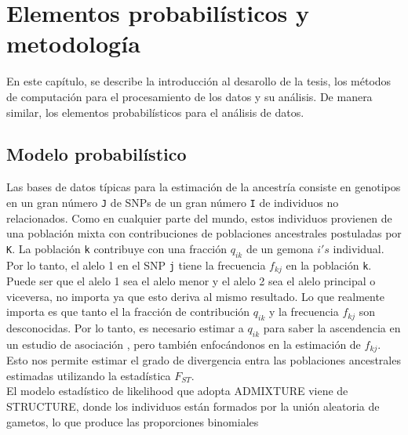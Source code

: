 

\chapter{Elementos probabil\'isticos y metodolog\'ia}
En este capítulo, se describe la introducción al desarollo de la tesis, los m\'etodos de computaci\'on para el procesamiento de los datos y su an\'alisis. De manera similar, los elementos probabil\'isticos para el an\'alisis de datos. 



\section{Modelo probabil\'istico}

Las bases de datos t\'ipicas para la estimaci\'on de la ancestr\'ia consiste en genotipos en un gran n\'umero \texttt{J} de SNPs de un gran n\'umero \texttt{I} de individuos no relacionados. Como en cualquier parte del mundo, estos individuos provienen de una poblaci\'on mixta con contribuciones de poblaciones ancestrales postuladas por \texttt{K}. La poblaci\'on \texttt{k} contribuye con una fracci\'on $q_{ik}$ de un gemona $i's$ individual. Por lo tanto, el alelo 1 en el SNP \texttt{j} tiene la frecuencia $f_{kj}$ en la poblaci\'on \texttt{k}.\\

Puede ser que el alelo 1 sea el alelo menor y el alelo 2 sea el alelo principal o viceversa, no importa ya que esto deriva al mismo resultado. Lo que realmente importa es que tanto el la fracci\'on de contribuci\'on $q_{ik}$ y la frecuencia $f_{kj}$ son desconocidas. Por lo tanto, es necesario estimar a $q_{ik}$ para saber la ascendencia en un estudio de asociaci\'on , pero tambi\'en enfoc\'andonos en la estimaci\'on de $f_{kj}$. Esto nos permite estimar el grado de divergencia entra las poblaciones ancestrales estimadas utilizando la estad\'istica $F_{ST}$. \\

El modelo estad\'istico de likelihood que adopta ADMIXTURE viene de STRUCTURE, donde los individuos est\'an formados por la uni\'on aleatoria de gametos, lo que produce las proporciones binomiales\\

